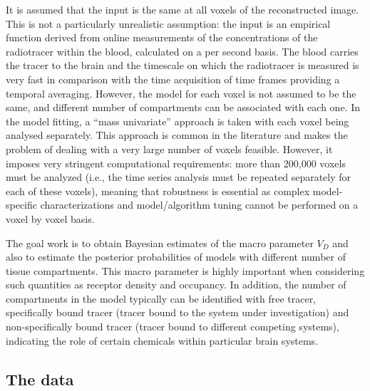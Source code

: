 It is assumed that the input is the same at all voxels of the reconstructed
image. This is not a particularly unrealistic assumption: the input is an
empirical function derived from online measurements of the concentrations
of the radiotracer within the blood, calculated on a per second basis. The
blood carries the tracer to the brain and the timescale on which the
radiotracer is measured is very fast in comparison with the time
acquisition of \pet time frames providing a temporal averaging. However,
the model for each voxel is not assumed to be the same, and different
number of compartments can be associated with each one. In the model
fitting, a ``mass univariate'' approach is taken with each voxel being
analysed separately. This approach is common in the literature and makes
the problem of dealing with a very large number of voxels feasible.
However, it imposes very stringent computational requirements: more than
200,000 voxels must be analyzed (i.e., the time series analysis must be
repeated separately for each of these voxels), meaning that robustness is
essential as complex model-specific characterizations and model/algorithm
tuning cannot be performed on a voxel by voxel basis.

The goal work is to obtain Bayesian estimates of the macro parameter $V_D$ and
also to estimate the posterior probabilities of models with different number
of tissue compartments. This macro parameter is highly important when
considering such quantities as receptor density and occupancy. In addition,
the number of compartments in the model typically can be identified with free
tracer, specifically bound tracer (tracer bound to the system under
investigation) and non-specifically bound tracer (tracer bound to different
competing systems), indicating the role of certain chemicals within particular
brain systems.

\subsection{The data}
\label{sub:The data}

